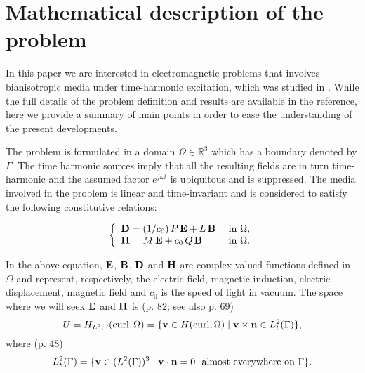 \section{Mathematical description of the problem}
In this paper we are interested in electromagnetic problems that involves 
bianisotropic media under time-harmonic excitation, which was studied in 
\cite{kalarickel2020well}.
While the full details of the problem definition and results are available 
in the reference, here we provide a summary of main points in order to 
ease the understanding of the present developments.

The problem is formulated in a domain $\Omega \in \mathbb{R}^3$ 
which has a boundary denoted by $\Gamma$.
The time harmonic sources imply that all the resulting fields 
are in turn time-harmonic and the assumed factor $e^{j\omega t}$ is 
ubiquitous and is suppressed.
The media involved in the problem is linear and time-invariant and 
is considered to satisfy the following constitutive relations:

    \begin{equation} \label{eq:constitutiveeqn}
      \left\{
        \begin{array}{ll}
          {\bf D} = (1/c_0) \, P \, {\bf E} + L \, {\bf B} 
            & \mbox{ in } \Omega,\\
          {\bf H} = M \, {\bf E} + c_0 \, Q \, {\bf B} 
            & \mbox{ in } \Omega.\\
        \end{array}
      \right.
    \end{equation}

In the above equation, ${\bf E}$, ${\bf B}$, ${\bf D}$ and ${\bf H}$ are 
complex valued functions defined in $\Omega$ and represent, respectively, 
the electric field, magnetic induction, electric displacement, magnetic field 
and $c_0$ is the speed of light in vacuum. 
The space where we will seek ${\bf E}$ and ${\bf H}$ is 
\cite{monkbook} (p. 82; see also p. 69)
%
\begin{equation}
  U=H_{L^2,\Gamma}(\mathrm{curl},\Omega) =
    \{ {\bf v} \in H(\mathrm{curl},\Omega) \; | \;
    {\bf v} \times {\bf n} \in L_t^2(\Gamma) \},
\end{equation}
%
where \cite{monkbook} (p. 48)
%
\begin{equation}
  L_t^2(\Gamma) = \{ {\bf v} \in (L^2(\Gamma))^3 \;|\;
    {\bf v} \cdot {\bf n} = 0 \ \textrm{ almost everywhere on }\Gamma\}.
\end{equation}

